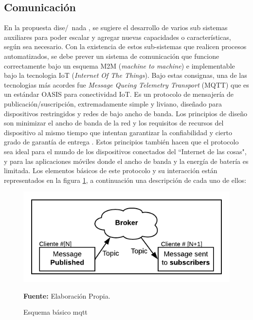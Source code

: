 \subsection{Comunicaci\'on}
En la propuesta dise/~nada , se sugiere el desarrollo de varios sub sistemas auxiliares para poder escalar y agregar nuevas capacidades o caracter\'isticas, seg\'un sea necesario.
Con la existencia de estos sub-sistemas que realicen procesos automatizados, se debe prever un sistema de comunicaci\'on que funcione correctamente bajo un esquema M2M (\textit{machine to machine}) e implementable bajo la tecnologia IoT (\textit{Internet Of The Things}). 
Bajo estas consignas, una de las tecnologias m\'as acordes fue \textit{Message Queing Telemetry Transport} (MQTT) que es un est\'andar OASIS para conectividad IoT. Es un protocolo de mensajer\'ia de publicaci\'on/suscripci\'on, extremadamente simple y liviano, dise\~nado para dispositivos restringidos y redes de bajo ancho de banda. Los principios de dise\~no son minimizar el ancho de banda de la red y los requisitos de recursos del dispositivo al mismo tiempo que intentan garantizar la confiabilidad y cierto grado de garant\'ia de entrega \cite{mqtt-no-date}. Estos principios tambi\'en hacen que el protocolo sea ideal para el mundo de los dispositivos conectados del ``Internet de las cosas", y para las aplicaciones m\'oviles donde el ancho de banda y la energ\'ia de bater\'ia es limitada.
Los elementos b\'asicos de este protocolo y su interacci\'on est\'an representados en la figura  \ref{fig:mqtt}, a continuaci\'on una descripci\'on de cada uno de ellos:
  \begin{figure}[ht]
        \centering
        \includegraphics[scale=0.6]{Imagenes/cap3/Esquema Mqtt.png}
        \caption[mqtt]{Esquema b\'asico mqtt}\textbf{Fuente:} Elaboración Propia.
        \label{fig:mqtt}
    \end{figure}
